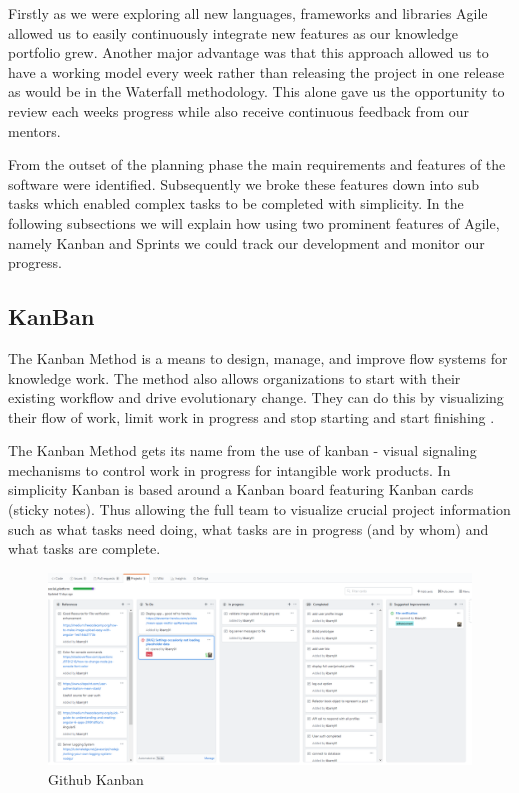 Firstly as we were exploring all new languages, frameworks and libraries Agile allowed us to easily continuously integrate new features as our knowledge portfolio grew. Another major advantage was that this approach allowed us to have a working model every week rather than releasing the project in one release as would be in the Waterfall methodology. This alone gave us the opportunity to review each weeks progress while also receive continuous feedback from our mentors.

From the outset of the planning phase the main requirements and features of the software were identified. Subsequently we broke these features down into sub tasks which enabled complex tasks to be completed with simplicity. In the following subsections we will explain how using two prominent features of Agile, namely Kanban and Sprints we could track our development and monitor our progress.


\subsection{KanBan} \label{KanbanSection}
The Kanban Method is a means to design, manage, and improve flow systems for knowledge work. The method also allows organizations to start with their existing workflow and drive evolutionary change. They can do this by visualizing their flow of work, limit work in progress and stop starting and start finishing \cite{kanban}.

The Kanban Method gets its name from the use of kanban - visual signaling mechanisms to control work in progress for intangible work products. In simplicity Kanban is based around a Kanban board featuring Kanban cards (sticky notes). Thus allowing the full team to visualize crucial project information such as what tasks need doing, what tasks are in progress (and by whom) and what tasks are complete. 

\begin{figure}[H]
  \includegraphics[width=\linewidth]{img/kanban.PNG}
  \caption{Github Kanban}
  \label{fig:kanban}
\end{figure}

